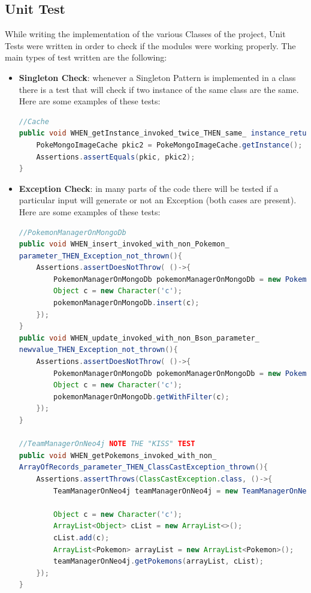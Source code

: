 \subsection{Unit Test}
While writing the implementation of the various Classes of the project, Unit Tests were written in order to check if the modules were working properly. The main types of test written are the following:
\begin{itemize}
	\item \textbf{Singleton Check}: whenever a Singleton Pattern is implemented in a class there is a test that will check if two instance of the same class are the same. Here are some examples of these tests:
\begin{lstlisting}[language=Java]
//Cache
public void WHEN_getInstance_invoked_twice_THEN_same_ instance_returned(){
	PokeMongoImageCache pkic2 = PokeMongoImageCache.getInstance();
	Assertions.assertEquals(pkic, pkic2);
}
\end{lstlisting}
	\item \textbf{Exception Check}: in many parts of the code there will be tested if a particular input will generate or not an Exception (both cases are present). Here are some examples of these tests:
\begin{lstlisting}[language=Java]
//PokemonManagerOnMongoDb
public void WHEN_insert_invoked_with_non_Pokemon_
parameter_THEN_Exception_not_thrown(){
	Assertions.assertDoesNotThrow( ()->{
		PokemonManagerOnMongoDb pokemonManagerOnMongoDb = new PokemonManagerOnMongoDb();
		Object c = new Character('c');
		pokemonManagerOnMongoDb.insert(c);
	});
}
public void WHEN_update_invoked_with_non_Bson_parameter_
newvalue_THEN_Exception_not_thrown(){
	Assertions.assertDoesNotThrow( ()->{
		PokemonManagerOnMongoDb pokemonManagerOnMongoDb = new PokemonManagerOnMongoDb();
		Object c = new Character('c');
		pokemonManagerOnMongoDb.getWithFilter(c);
	});
}

//TeamManagerOnNeo4j NOTE THE "KISS" TEST
public void WHEN_getPokemons_invoked_with_non_
ArrayOfRecords_parameter_THEN_ClassCastException_thrown(){
	Assertions.assertThrows(ClassCastException.class, ()->{
		TeamManagerOnNeo4j teamManagerOnNeo4j = new TeamManagerOnNeo4j();
		
		Object c = new Character('c');
		ArrayList<Object> cList = new ArrayList<>();
		cList.add(c);
		ArrayList<Pokemon> arrayList = new ArrayList<Pokemon>();
		teamManagerOnNeo4j.getPokemons(arrayList, cList);
	});
}
\end{lstlisting}
	

\end{itemize}
